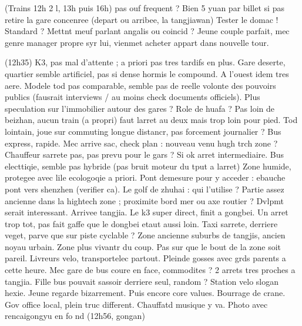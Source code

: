 (Trains 12h 2 l, 13h puis 16h) pas ouf frequent ?
Bien 5 yuan par billet si pas retire la gare concenree (depart ou arribee, la tangjiawan)
Tester le domac ! Standard ? Mettnt meuf parlant angalis ou coincid ?
Jeune couple parfait, mec genre manager propre syr lui, vienmet acheter appart dans nouvelle tour.


(12h35)
K3, pas mal d'attente ; a priori pas tres tardifs en plus.
Gare deserte, quartier semble artificiel, pas si dense hormis le compound. A l'ouest idem tres aere.
Modele tod pas comparable, semble pas de reelle volonte des pouvoirs publics (fausrait interviews / au moins check documents officiels). Plus speculation sur l'immobilier autour des gares ? Role de huafa ? Pas loin de beizhan, aucun train (a propri) faut larret au deux mais trop loin pour pied. Tod lointain, joue sur commuting longue distancr, pas forcement journalier ? Bus express, rapide.
Mec arrive sac, check plan : nouveau venu hugh trch zone ? Chauffeur sarrete pas, pas prevu pour le gars ? Si ok arret intermediaire.
Bus electtiqie, semble pas hybride (pas bruit moteur du tput a larret)
Zone humide, protegee avec lile ecologoqie a priori. Pont demesure pour y acceder : ebauche pont vers shenzhen (verifier ca).
Le golf de zhuhai : qui l'utilise ?
Partie assez ancienne dans la hightech zone ; proximite bord mer ou axe routier ? Dvlpmt serait interessant.
Arrivee tangjia. Le k3 super direct, finit a gongbei. Un arret trop tot, pas fait gaffe que le dongbei etaut aussi loin. Taxi sarrete, derriere veget, parve que sur piste cyclable ?
Zone ancienne suburbs de tangjis, ancien noyau urbain. Zone plus vivantr du coup. Pas sur que le bout de la zone soit pareil.
Livreurs velo, transportelec partout. Pleinde gosses avec grds parents a cette heure. Mec gare de bus coure en face, commodites ?
2 arrets tres proches a tangjia. Fille bus pouvait sassoir derriere seul, random ?
Station velo slogan hexie. Jeune regarde bizarrement. Puis encore core values. Bourrage de crane. Gov office local, plein truc different. Chauffatd musique y va. Photo avec rencaigongyu en fo nd
(12h56, gongan)
















